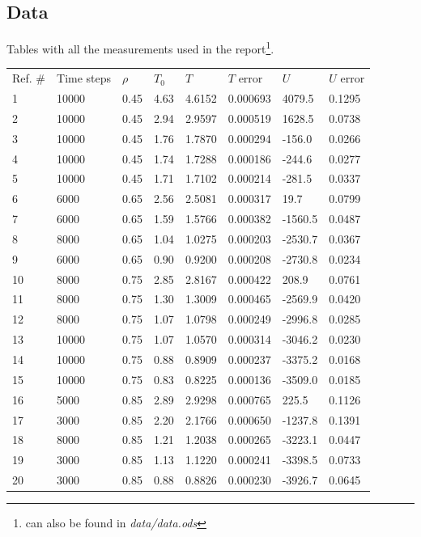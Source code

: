 \documentclass{article}
\begin{document}
\subsection{Data}
Tables with all the measurements used in the report\footnote{can also be found in \emph{data/data.ods}}.
\begin{center}
\begin{tabular}{llllllll}
Ref. \# & Time steps & $\rho$ & $T_0$ & $T$ & $T$ error & $U$ & $U$ error\\
1 & 10000 & 0.45 & 4.63 & 4.6152 & 0.000693 & 4079.5 & 0.1295\\
2 & 10000 & 0.45 & 2.94 & 2.9597 & 0.000519 & 1628.5 & 0.0738\\
3 & 10000 & 0.45 & 1.76 & 1.7870 & 0.000294 & -156.0 & 0.0266\\
4 & 10000 & 0.45 & 1.74 & 1.7288 & 0.000186 & -244.6 & 0.0277\\
5 & 10000 & 0.45 & 1.71 & 1.7102 & 0.000214 & -281.5 & 0.0337\\
6 & 6000 & 0.65 & 2.56 & 2.5081 & 0.000317 & 19.7 & 0.0799\\
7 & 6000 & 0.65 & 1.59 & 1.5766 & 0.000382 & -1560.5 & 0.0487\\
8 & 8000 & 0.65 & 1.04 & 1.0275 & 0.000203 & -2530.7 & 0.0367\\
9 & 6000 & 0.65 & 0.90 & 0.9200 & 0.000208 & -2730.8 & 0.0234\\
10 & 8000 & 0.75 & 2.85 & 2.8167 & 0.000422 & 208.9 & 0.0761\\
11 & 8000 & 0.75 & 1.30 & 1.3009 & 0.000465 & -2569.9 & 0.0420\\
12 & 8000 & 0.75 & 1.07 & 1.0798 & 0.000249 & -2996.8 & 0.0285\\
13 & 10000 & 0.75 & 1.07 & 1.0570 & 0.000314 & -3046.2 & 0.0230\\
14 & 10000 & 0.75 & 0.88 & 0.8909 & 0.000237 & -3375.2 & 0.0168\\
15 & 10000 & 0.75 & 0.83 & 0.8225 & 0.000136 & -3509.0 & 0.0185\\
16 & 5000 & 0.85 & 2.89 & 2.9298 & 0.000765 & 225.5 & 0.1126\\
17 & 3000 & 0.85 & 2.20 & 2.1766 & 0.000650 & -1237.8 & 0.1391\\
18 & 8000 & 0.85 & 1.21 & 1.2038 & 0.000265 & -3223.1 & 0.0447\\
19 & 3000 & 0.85 & 1.13 & 1.1220 & 0.000241 & -3398.5 & 0.0733\\
20 & 3000 & 0.85 & 0.88 & 0.8826 & 0.000230 & -3926.7 & 0.0645\\

\end{tabular}
\end{center}
\end{document}
